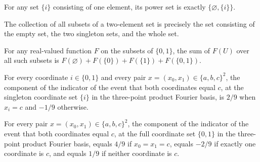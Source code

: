 \begin{theorem}
\label{FABL.powerset_singleton_eq}
\leanok
{}
For any set $\{i\}$ consisting of one element, its power set is exactly
$\{\varnothing,\{i\}\}$.
\end{theorem}

\begin{theorem}
\label{FABL.univ_finset_finset_finTwo}
\leanok
{}
The collection of all subsets of a two-element set is precisely the set consisting of
the empty set, the two singleton sets, and the whole set.
\end{theorem}

\begin{theorem}
\label{FABL.sum_finset_finTwo}
\leanok
{}
For any real-valued function $F$ on the subsets of $\{0,1\}$, the sum of $F(U)$ over all
such subsets is $F(\varnothing)+F(\{0\})+F(\{1\})+F(\{0,1\})$.
\end{theorem}

\begin{theorem}
\label{FABL.threePointBothCIndicator_orthogonalComponent_singleton}
\leanok
{}
For every coordinate $i\in\{0,1\}$ and every pair $x=(x_0,x_1)\in\{a,b,c\}^2$, the
component of the indicator of the event that both coordinates equal $c$, at the
singleton coordinate set $\{i\}$ in the three-point product Fourier basis, is $2/9$ when
$x_i=c$ and $-1/9$ otherwise.
\end{theorem}

\begin{theorem}
\label{FABL.threePointBothCIndicator_orthogonalComponent_pair}
\leanok
{}
For every pair $x=(x_0,x_1)\in\{a,b,c\}^2$, the component of the indicator of the event
that both coordinates equal $c$, at the full coordinate set $\{0,1\}$ in the three-point
product Fourier basis, equals $4/9$ if $x_0=x_1=c$, equals $-2/9$ if exactly one
coordinate is $c$, and equals $1/9$ if neither coordinate is $c$.
\end{theorem}

